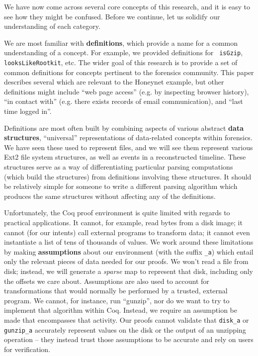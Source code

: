 \documentclass[nocopyrightspace]{sigplanconf}
\begin{document}
We have now come across several core concepts of this research, and it is easy
to see how they might be confused. Before we continue, let us solidify our
understanding of each category.

We are most familiar with {\bf definitions}, which provide a name for a common
understanding of a concept. For example, we provided definitions for {\tt
isGzip}, {\tt looksLikeRootkit}, etc. The wider goal of this research is to
provide a set of common definitions for concepts pertinent to the forensics
community. This paper describes several which are relevant to the Honeynet
example, but other definitions might include ``web page access'' (e.g. by
inspecting browser history), ``in contact with'' (e.g. there exists records of
email communication), and ``last time logged in''.

Definitions are most often built by combining aspects of various abstract {\bf
data structures}, ``universal'' representations of data-related concepts
within forensics. We have seen these used to represent files, and we will see
them represent various Ext2 file system structures, as well as events in a
reconstructed timeline. These structures serve as a way of differentiating
particular parsing computations (which build the structures) from definitions
involving these structures. It should be relatively simple for someone to
write a different parsing algorithm which produces the same structures without
affecting any of the definitions.

Unfortunately, the Coq proof environment is quite limited with regards to
practical applications. It cannot, for example, read bytes from a disk image;
it cannot (for our intents) call external programs to transform data; it
cannot even instantiate a list of tens of thousands of values. We work around
these limitations by making {\bf assumptions} about our environment (with the
suffix {\tt \_a}) which entail only the relevant pieces of data needed for our
proofs. We won't read a file from disk; instead, we will generate a {\it
sparse} map to represent that disk, including only the offsets we care about.
Assumptions are also used to account for transformations that would normally
be performed by a trusted, external program. We cannot, for instance, run
``gunzip'', nor do we want to try to implement that algorithm within Coq.
Instead, we require an assumption be made that encompasses that activity. Our
proofs cannot validate that {\tt disk\_a} or {\tt gunzip\_a} accurately
represent values on the disk or the output of an unzipping operation -- they
instead trust those assumptions to be accurate and rely on users for
verification.
\end{document}

